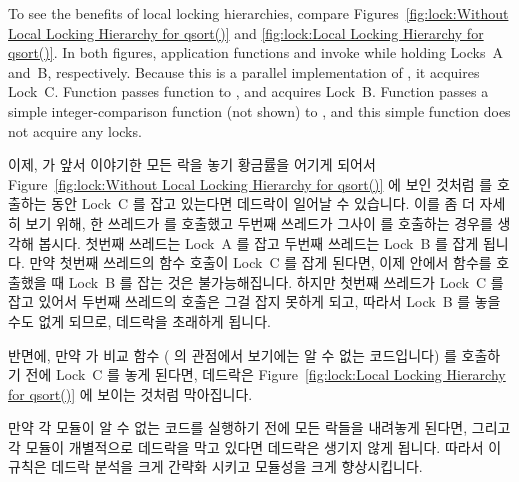 To see the benefits of local locking hierarchies, compare
Figures~\ref{fig:lock:Without Local Locking Hierarchy for qsort()} and
\ref{fig:lock:Local Locking Hierarchy for qsort()}.
In both figures, application functions  and 
invoke  while holding Locks~A and~B, respectively.
Because this is a parallel implementation of , it acquires
Lock~C.
Function  passes function  to ,
and  acquires Lock~B.
Function  passes a simple integer-comparison function (not
shown) to , and this simple function does not acquire any
locks.
\fi

이제,  가 앞서 이야기한 모든 락을 놓기 황금률을 어기게 되어서
Figure~\ref{fig:lock:Without Local Locking Hierarchy for qsort()} 에 보인
것처럼  를 호출하는 동안 Lock~C 를 잡고 있는다면 데드락이 일어날 수
있습니다.
이를 좀 더 자세히 보기 위해, 한 쓰레드가  를 호출했고 두번째 쓰레드가
그사이  를 호출하는 경우를 생각해 봅시다.
첫번째 쓰레드는 Lock~A 를 잡고 두번째 쓰레드는 Lock~B 를 잡게 됩니다.
만약 첫번째 쓰레드의  함수 호출이 Lock~C 를 잡게 된다면, 이제
 안에서  함수를 호출했을 때 Lock~B 를 잡는 것은
불가능해집니다.
하지만 첫번째 쓰레드가 Lock~C 를 잡고 있어서 두번째 쓰레드의 
호출은 그걸 잡지 못하게 되고, 따라서 Lock~B 를 놓을 수도 없게 되므로, 데드락을
초래하게 됩니다.

반면에, 만약  가 비교 함수 ( 의 관점에서 보기에는 알 수
없는 코드입니다) 를 호출하기 전에 Lock~C 를 놓게 된다면, 데드락은
Figure~\ref{fig:lock:Local Locking Hierarchy for qsort()} 에 보이는 것처럼
막아집니다.

만약 각 모듈이 알 수 없는 코드를 실행하기 전에 모든 락들을 내려놓게 된다면,
그리고 각 모듈이 개별적으로 데드락을 막고 있다면 데드락은 생기지 않게 됩니다.
따라서 이 규칙은 데드락 분석을 크게 간략화 시키고 모듈성을 크게 향상시킵니다.
\iffalse

